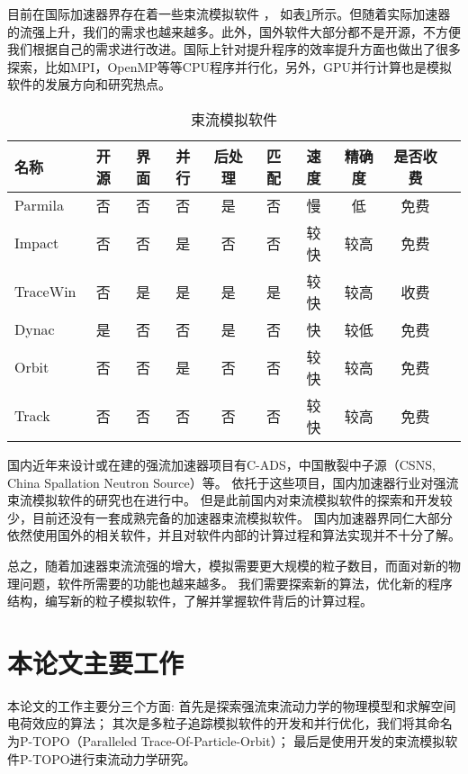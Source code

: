 目前在国际加速器界存在着一些束流模拟软件
\cite{cern_codeList,takeda1998PARMILA,qiang1999impact,uriot2014tracewin,tanke2002dynac,shishlo2006orbit,aseev2005track}，
如表\ref{tab:space_charge_code}所示。但随着实际加速器的流强上升，我们的需求也越来越多。此外，国外软件大部分都不是开源，不方便我们根据自己的需求进行改进。国际上针对提升程序的效率提升方面也做出了很多探索，比如MPI，OpenMP等等CPU程序并行化，另外，GPU并行计算也是模拟软件的发展方向和研究热点。

\begin{table}
  \centering
  \begin{tabular}{|>{\small}l|c|c|c|c|c|c|c|c|c|}
    \hline
    名称	        &开源     &界面       &并行	&后处理     &匹配	&速度 &精确度	 & 是否收费  \\
    \hline
    Parmila  	&否	   &否	   &否	&是	     &否 	&慢	 &低	     & 免费	\\
    Impact  	&否	   &否	   &是	&否	     &否	    &较快 &较高	 & 免费	\\
    TraceWin  	&否	   &是	   &是	&是	     &是	    &较快 &较高	 & 收费	\\
    Dynac  	    &是	   &否	   &否	&是	     &否	    &快     &较低	 & 免费	\\
    Orbit  	    &否	   &否	   &是	&否	     &否	    &较快 &较高	 & 免费	\\
    Track  	    &否	   &否	   &否	&否	     &否 	&较快 &较高	 & 免费	\\
    \hline
  \end{tabular}
  \caption{束流模拟软件}
  \label{tab:space_charge_code}
\end{table}

国内近年来设计或在建的强流加速器项目有C-ADS，中国散裂中子源（CSNS, China Spallation Neutron Source）等。
依托于这些项目，国内加速器行业对强流束流模拟软件的研究也在进行中。
但是此前国内对束流模拟软件的探索和开发较少，目前还没有一套成熟完备的加速器束流模拟软件。
国内加速器界同仁大部分依然使用国外的相关软件，并且对软件内部的计算过程和算法实现并不十分了解。

总之，随着加速器束流流强的增大，模拟需要更大规模的粒子数目，而面对新的物理问题，软件所需要的功能也越来越多。
我们需要探索新的算法，优化新的程序结构，编写新的粒子模拟软件，了解并掌握软件背后的计算过程。

\section{本论文主要工作}
本论文的工作主要分三个方面:
首先是探索强流束流动力学的物理模型和求解空间电荷效应的算法；
其次是多粒子追踪模拟软件的开发和并行优化，我们将其命名为P-TOPO（Paralleled Trace-Of-Particle-Orbit）；
最后是使用开发的束流模拟软件P-TOPO进行束流动力学研究。

